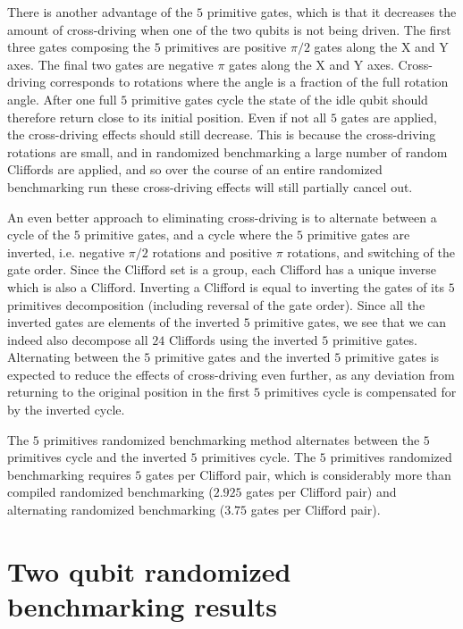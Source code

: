         There is another advantage of the $5$ primitive gates, which is that it decreases the amount of cross-driving when one of the two qubits is not being driven. The first three gates composing the $5$ primitives are positive $\pi/2$ gates along the X and Y axes. The final two gates are negative $\pi$ gates along the X and Y axes. Cross-driving corresponds to rotations where the angle is a fraction of the full rotation angle. After one full $5$ primitive gates cycle the state of the idle qubit should therefore return close to its initial position. Even if not all $5$ gates are applied, the cross-driving effects should still decrease. This is because the cross-driving rotations are small, and in randomized benchmarking a large number of random Cliffords are applied, and so over the course of an entire randomized benchmarking run these cross-driving effects will still partially cancel out.

        An even better approach to eliminating cross-driving is to alternate between a cycle of the $5$ primitive gates, and a cycle where the $5$ primitive gates are inverted, i.e. negative $\pi/2$ rotations and positive $\pi$ rotations, and switching of the gate order. Since the Clifford set is a group, each Clifford has a unique inverse which is also a Clifford. Inverting a Clifford is equal to inverting the gates of its $5$ primitives decomposition (including reversal of the gate order). Since all the inverted gates are elements of the inverted $5$ primitive gates, we see that we can indeed also decompose all $24$ Cliffords using the inverted $5$ primitive gates. Alternating between the $5$ primitive gates and the inverted $5$ primitive gates is expected to reduce the effects of cross-driving even further, as any deviation from returning to the original position in the first $5$ primitives cycle is compensated for by the inverted cycle.

        The $5$ primitives randomized benchmarking method alternates between the $5$ primitives cycle and the inverted $5$ primitives cycle. The $5$ primitives randomized benchmarking requires $5$ gates per Clifford pair, which is considerably more than compiled randomized benchmarking ($2.925$ gates per Clifford pair) and alternating randomized benchmarking ($3.75$ gates per Clifford pair).

        \section{Two qubit randomized benchmarking results}
          \label{Two qubit randomized benchmarking results}

